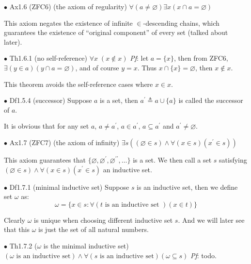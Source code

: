 \documentclass{article}
\begin{document}
\begin{Ax}{$\bullet$ Ax1.6 (ZFC6) (the axiom of regularity)}
    \textcolor{Ax}{$\forall (a\neq \varnothing)\exists x\left(x\cap a = \varnothing\right)$}
\end{Ax}
This axiom negates the existence of infinite $\in$-descending chains, which guarantees the existence of ``original component'' of every set (talked about later). 

\begin{Th}{$\bullet$ Th1.6.1 (no self-reference)}
    \textcolor{Th}{$\forall x \;(x\notin x)$}
    \tcblower
    \textit{Pf}: let $a = \{x\}$, then from ZFC6, $\exists (y\in a)(y\cap a = \varnothing)$, and of course $y = x$. Thus $x\cap \{x\} = \varnothing$, then $x\notin x$.
\end{Th}
This theorem avoids the self-reference cases where $x\in x$.

\begin{Df}{$\bullet$ Df1.5.4 (successor)}
    Suppose $a$ is a set, then $a^\prime \triangleq a\cup \{a\}$ is called the successor of $a$.
\end{Df}
\textcolor{Th}{It is obvious that for any set $a$, $a\neq a^\prime$, $a\in a^\prime$, $a\subseteq a^\prime$ and $a^\prime \neq \varnothing$.}

\begin{Ax}{$\bullet$ Ax1.7 (ZFC7) (the axiom of infinity)}
    \textcolor{Ax}{$\exists s \left((\varnothing\in s)\land \forall (x\in s) (x^\prime\in s)\right)$}
\end{Ax}
This axiom guarantees that $\{\varnothing, \varnothing^\prime, \varnothing^{\prime\prime}, \dots\}$ is a set. We then call a set $s$ satisfying $(\varnothing\in s)\land \forall (x\in s) (x^\prime\in s)$ an inductive set.

\begin{Df}{$\bullet$ Df1.7.1 (minimal inductive set)}
    Suppose $s$ is an inductive set, then we define set $\omega$ as:
    $$\omega = \{x\in s: \forall (t \text{ is an inductive set }) (x\in t)\}$$
\end{Df}
\textcolor{Th}{Clearly $\omega$ is unique when choosing different inductive set $s$.} And we will later see that this $\omega$ is just the set of all natural numbers.

\begin{Th}{$\bullet$ Th1.7.2 ($\omega$ is the minimal inductive set)}
    \textcolor{Th}{$\left(\omega \text{ is an inductive set}\right)\land \forall (s\text{ is an inductive set}) (\omega\subseteq s)$}
    \tcblower
    \textit{Pf}: todo.
\end{Th}
\end{document}
